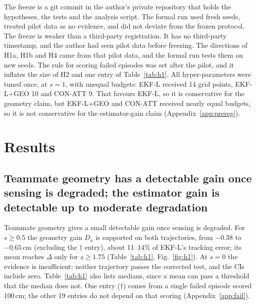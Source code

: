 \documentclass[conference]{IEEEtran}
\begin{document}
The freeze is a git commit in the author's private repository that holds the hypotheses, the tests and the analysis script. The formal run used fresh seeds, treated pilot data as no evidence, and did not deviate from the frozen protocol. The freeze is weaker than a third-party registration. It has no third-party timestamp, and the author had seen pilot data before freezing. The directions of H1a, H1b and H4 came from that pilot data, and the formal run tests them on new seeds. The rule for scoring failed episodes was set after the pilot, and it inflates the size of H2 and one entry of Table~\ref{tab:h1}. All hyper-parameters were tuned once, at $s{=}1$, with unequal budgets: EKF-L received 14 grid points, EKF-L+GEO 10 and CON-ATT 9. That favours EKF-L, so it is conservative for the geometry claim, but EKF-L+GEO and CON-ATT received nearly equal budgets, so it is not conservative for the estimator-gain claim (Appendix~\ref{app:prereg}).

\section{Results}
\subsection{Teammate geometry has a detectable gain once sensing is degraded; the estimator gain is detectable up to moderate degradation}
Teammate geometry gives a small detectable gain once sensing is degraded. For $s\ge0.5$ the geometry gain $D_a$ is supported on both trajectories, from $-0.38$ to $-0.65$\,cm (excluding the $\dagger$ entry), about 11--14\% of EKF-L's tracking error; its mean reaches $\Delta$ only for $s\ge1.75$ (Table~\ref{tab:h1}, Fig.~\ref{fig:h1}). At $s=0$ the evidence is insufficient: neither trajectory passes the corrected test, and the CIs include zero. Table~\ref{tab:h1} also lists medians, since a mean can pass a threshold that the median does not. One entry ($\dagger$) comes from a single failed episode scored 100\,cm; the other 19 entries do not depend on that scoring (Appendix~\ref{app:fail}).
\end{document}
